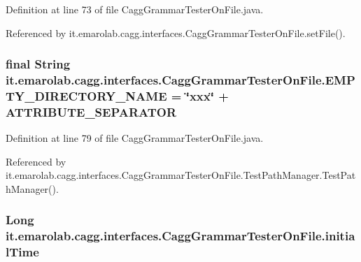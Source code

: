 Definition at line 73 of file Cagg\-Grammar\-Tester\-On\-File.\-java.



Referenced by it.\-emarolab.\-cagg.\-interfaces.\-Cagg\-Grammar\-Tester\-On\-File.\-set\-File().

\hypertarget{classit_1_1emarolab_1_1cagg_1_1interfaces_1_1CaggGrammarTesterOnFile_a6f6d6ac91cb69282b2fe915025ad2090}{
\subsubsection[{E\-M\-P\-T\-Y\-\_\-\-D\-I\-R\-E\-C\-T\-O\-R\-Y\-\_\-\-N\-A\-M\-E}]{\setlength{\rightskip}{0pt plus 5cm}final String it.\-emarolab.\-cagg.\-interfaces.\-Cagg\-Grammar\-Tester\-On\-File.\-E\-M\-P\-T\-Y\-\_\-\-D\-I\-R\-E\-C\-T\-O\-R\-Y\-\_\-\-N\-A\-M\-E = \char`\"{}xxx\char`\"{} + A\-T\-T\-R\-I\-B\-U\-T\-E\-\_\-\-S\-E\-P\-A\-R\-A\-T\-O\-R\hspace{0.3cm}{\ttfamily [static]}}}\label{classit_1_1emarolab_1_1cagg_1_1interfaces_1_1CaggGrammarTesterOnFile_a6f6d6ac91cb69282b2fe915025ad2090}


Definition at line 79 of file Cagg\-Grammar\-Tester\-On\-File.\-java.



Referenced by it.\-emarolab.\-cagg.\-interfaces.\-Cagg\-Grammar\-Tester\-On\-File.\-Test\-Path\-Manager.\-Test\-Path\-Manager().

\hypertarget{classit_1_1emarolab_1_1cagg_1_1interfaces_1_1CaggGrammarTesterOnFile_aa7fa89b5e8c79da8dc430363895eef6b}{
\subsubsection[{initial\-Time}]{\setlength{\rightskip}{0pt plus 5cm}Long it.\-emarolab.\-cagg.\-interfaces.\-Cagg\-Grammar\-Tester\-On\-File.\-initial\-Time\hspace{0.3cm}{\ttfamily [private]}}}\label{classit_1_1emarolab_1_1cagg_1_1interfaces_1_1CaggGrammarTesterOnFile_aa7fa89b5e8c79da8dc430363895eef6b}


